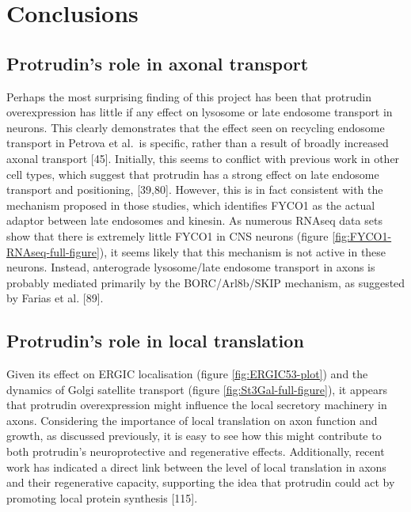 \documentclass[
  12pt,
  a4paper,
]{book}
\begin{document}
\hypertarget{conclusions}{%
\section{Conclusions}\label{conclusions}}

\hypertarget{protrudins-role-in-axonal-transport}{%
\subsection{Protrudin's role in axonal transport}\label{protrudins-role-in-axonal-transport}}

Perhaps the most surprising finding of this project has been that protrudin overexpression has little if any effect on lysosome or late endosome transport in neurons. This clearly demonstrates that the effect seen on recycling endosome transport in Petrova et al.~is specific, rather than a result of broadly increased axonal transport {[}45{]}. Initially, this seems to conflict with previous work in other cell types, which suggest that protrudin has a strong effect on late endosome transport and positioning, {[}39,80{]}. However, this is in fact consistent with the mechanism proposed in those studies, which identifies FYCO1 as the actual adaptor between late endosomes and kinesin. As numerous RNAseq data sets show that there is extremely little FYCO1 in CNS neurons (figure \ref{fig:FYCO1-RNAseq-full-figure}), it seems likely that this mechanism is not active in these neurons. Instead, anterograde lysosome/late endosome transport in axons is probably mediated primarily by the BORC/Arl8b/SKIP mechanism, as suggested by Farias et al. {[}89{]}.

\hypertarget{protrudins-role-in-local-translation}{%
\subsection{Protrudin's role in local translation}\label{protrudins-role-in-local-translation}}

Given its effect on ERGIC localisation (figure \ref{fig:ERGIC53-plot}) and the dynamics of Golgi satellite transport (figure \ref{fig:St3Gal-full-figure}), it appears that protrudin overexpression might influence the local secretory machinery in axons. Considering the importance of local translation on axon function and growth, as discussed previously, it is easy to see how this might contribute to both protrudin's neuroprotective and regenerative effects. Additionally, recent work has indicated a direct link between the level of local translation in axons and their regenerative capacity, supporting the idea that protrudin could act by promoting local protein synthesis {[}115{]}.
\end{document}
